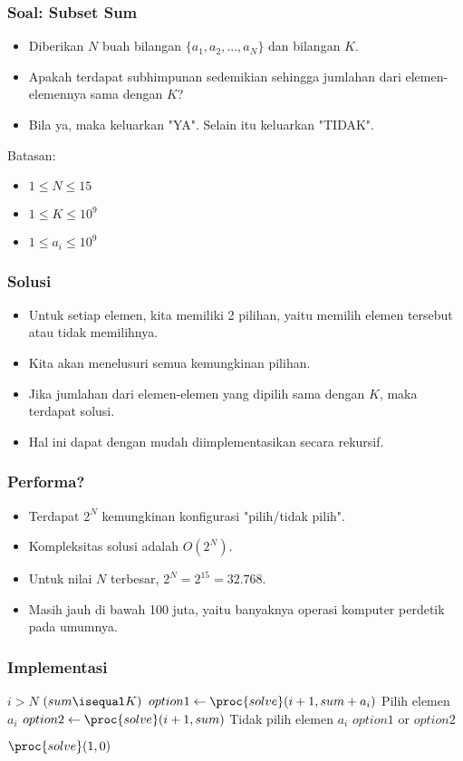 \begin{frame}
\frametitle{Soal: Subset Sum}
\begin{itemize}
  \item Diberikan $N$ buah bilangan $\{a_1, a_2, ..., a_N\}$ dan bilangan $K$.
  \item Apakah terdapat subhimpunan sedemikian sehingga jumlahan dari elemen-elemennya sama dengan $K$? 
  \item Bila ya, maka keluarkan "YA". Selain itu keluarkan "TIDAK".
\end{itemize}

Batasan:
\begin{itemize} 
  \item $1 \leq N \leq 15$
  \item $1 \leq K \leq 10^9$
  \item $1 \leq a_i \leq 10^9$
\end{itemize}
\end{frame}

\begin{frame}
\frametitle{Solusi}
\begin{itemize}
  \item Untuk setiap elemen, kita memiliki 2 pilihan, yaitu memilih elemen tersebut atau tidak memilihnya.
  \item Kita akan menelusuri semua kemungkinan pilihan.
  \item Jika jumlahan dari elemen-elemen yang dipilih sama dengan $K$, maka terdapat solusi.
  \item Hal ini dapat dengan mudah diimplementasikan secara rekursif.
\end{itemize}
\end{frame}

\begin{frame}
\frametitle{Performa?}
\begin{itemize}
  \item Terdapat $2^N$ kemungkinan konfigurasi "pilih/tidak pilih".
  \item Kompleksitas solusi adalah $O(2^N)$.
  \item Untuk nilai $N$ terbesar, $2^N = 2^{15} = 32.768$.
  \item Masih jauh di bawah 100 juta, yaitu banyaknya operasi komputer perdetik pada umumnya.
\end{itemize}
\end{frame}

\begin{frame}
\frametitle{Implementasi}
\begin{codebox}
\li \If $i > N$ \Then
\li   \Return $(sum \isequal K)$
    \End
\zi
\li $option1 \gets \proc{solve}(i+1, sum + a_i)$ \Comment Pilih elemen $a_i$
\li $option2 \gets \proc{solve}(i+1, sum)$ \Comment Tidak pilih elemen $a_i$
\li \Return $option1$ or $option2$
\end{codebox}

\begin{codebox}
\li \Return $\proc{solve}(1, 0)$
\end{codebox}

\end{frame}

